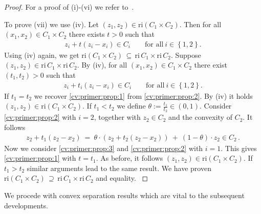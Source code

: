 \begin{proof}
  For a proof of (i)-(vi) we refer to~\cite[Theorem 6.2 - 6.7]{Rockafellar1970}.

To prove (vii) we use (iv).
Let
  $
  (z_1, z_2)
  \in 
  \mathrm{ri}(C_1\!\times C_2).
  $
  Then for all 
  $
  (x_1, x_2)
  \in 
  C_1\!\times C_2
  $
  there exists
  $t>0$
  such that
  \begin{gather}
    \label{cv:primer:prop:1}
      z_i + t (z_i-x_i)
      \in C_i
      \qquad
      \text{for all}\ 
      i\in \left\{ 1,2 \right\}.
  \end{gather}
  Using (iv) again, we get
  $
  \mathrm{ri}(C_1\!\times C_2)
  \, 
  \subseteq
  \,
          \mathrm{ri}\,C_1
          \! 
          \times
          \mathrm{ri}\,C_2
  $.
  Suppose 
  $
  (z_1,z_2)
    \in
    \mathrm{ri}\,C_1
    \!
    \times
    \mathrm{ri}\,C_2
  $.
  By (iv), for all
  $
    (x_1,x_2)\in C_1\times C_2
  $
  there exist
  $
    (t_1,t_2)>0
  $
  such that
  \begin{gather}
    \label{cv:primer:prop:2}
      z_i + t_i (z_i-x_i)
      \in C_i
      \qquad
      \text{for all}\ 
      i\in \left\{ 1,2 \right\}.
  \end{gather}
  If $t_1=t_2$
  we recover
  \eqref{cv:primer:prop:1}
  from
  \eqref{cv:primer:prop:2}.
  By (iv) it holds
  $
  (z_1,z_2)
    \in
    \mathrm{ri}
    (C_1
    \!
    \times
    C_2)
  $.
  If
  $t_1<t_2$
  we
  define $\theta:=\frac{t_1}{t_2}\in (0,1).$
  Consider  
  \eqref{cv:primer:prop:2} with $i=2$,
  together with $z_2 \in C_2$
  and
  the convexity of $C_2$.
  It follows
  \begin{gather}
    \label{cv:primer:prop:3}
    z_2 + t_1 (z_2 - x_2)
    \ 
    =
    \ 
    \theta
    \cdot
    (
    z_2 + t_2 (z_2 - x_2)
    )
    \ 
    +
    \ 
    (1-\theta)
    \cdot
    z_2
    \in C_2
    \,.
  \end{gather}
  Now we consider
  \eqref{cv:primer:prop:3} and
  \eqref{cv:primer:prop:2} with $i=1$.
  This gives \eqref{cv:primer:prop:1} with $t=t_1$.
  As before, it follows
  $
  (z_1,z_2)\in\mathrm{ri}(C_1\!\times C_2)
  $.
  If 
  $t_1>t_2$
  similar arguments lead to the same result.
  We have proven 
  $
  \mathrm{ri}(C_1\!\times C_2)
  \, 
  \supseteq
  \,
          \mathrm{ri}\,C_1
          \! 
          \times
          \mathrm{ri}\,C_2
  $
  and equality.
    \cite[Theorem~2.92]{Mordukhovich2022}
\end{proof}
 
We procede with convex separation results which are vital to the subsequent developments.

